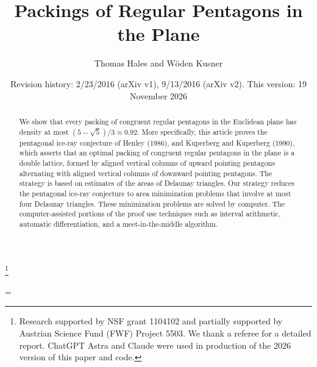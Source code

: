 \documentclass{amsart}
\numberwithin{equation}{section}
\numberwithin{figure}{section}
\numberwithin{table}{section}
\theoremstyle{plain}
\theoremstyle{definition}
\theoremstyle{remark}
\begin{document}
\title
    {Packings of Regular Pentagons in the Plane}
\author{Thomas Hales and W\"oden Kusner}
\date{Revision history: 2/23/2016 (arXiv v1), 9/13/2016 (arXiv v2). This version: 19 November 2026}
\thanks{Research supported by NSF grant 1104102 and partially supported by Austrian Science Fund (FWF) Project 5503. We thank a referee for a detailed report.
ChatGPT Astra and Claude were used in production of the 2026 version of this paper and code.}

\begin{abstract}  
We show that every packing of congruent regular pentagons in the Euclidean plane has
density at most $(5-\sqrt5)/3\approx 0.92$.     More specifically,
this article proves the pentagonal ice-ray
conjecture of Henley (1986), and Kuperberg and Kuperberg (1990), 
which asserts that an optimal packing of congruent regular pentagons in the plane is a double lattice,
formed by aligned vertical columns of upward pointing pentagons alternating
with aligned vertical columns of downward pointing pentagons.  The strategy is based on estimates
of the areas of Delaunay triangles.  Our strategy reduces the pentagonal ice-ray conjecture to
area minimization problems that involve at most four Delaunay triangles.  These minimization problems
are solved by computer.  The computer-assisted portions of the proof use techniques such as
interval arithmetic, automatic differentiation, and a meet-in-the-middle algorithm.
\end{abstract}


\parskip=\baselineskip

 \maketitle



    


      
%
      
       
%
      
      
%





%
\end{document}
